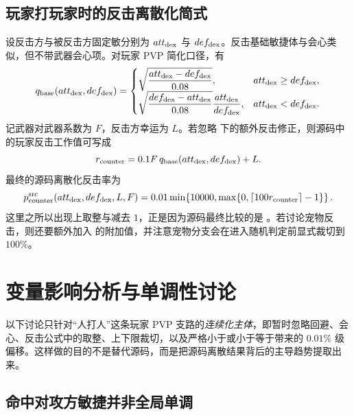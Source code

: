 \subsection{玩家打玩家时的反击离散化简式}

设反击方与被反击方固定敏分别为 $att_{\mathrm{dex}}$ 与 $def_{\mathrm{dex}}$。反击基础敏捷体与会心类似，但不带武器会心项。对玩家 PVP 简化口径，有
\begin{equation}
    q_{\mathrm{base}}(att_{\mathrm{dex}},def_{\mathrm{dex}})=
    \begin{cases}
        \sqrt{\dfrac{att_{\mathrm{dex}}-def_{\mathrm{dex}}}{0.08}}, & att_{\mathrm{dex}} \ge def_{\mathrm{dex}}, \\
        \sqrt{\dfrac{def_{\mathrm{dex}}-att_{\mathrm{dex}}}{0.08}}\dfrac{att_{\mathrm{dex}}}{def_{\mathrm{dex}}}, & att_{\mathrm{dex}} < def_{\mathrm{dex}}.
    \end{cases}
    \label{eq:counter-base}
\end{equation}
记武器对武器系数为 $F$，反击方幸运为 $L$。若忽略  下的额外反击修正，则源码中的玩家反击工作值可写成
\begin{equation}
    r_{\mathrm{counter}} = 0.1F\,q_{\mathrm{base}}(att_{\mathrm{dex}},def_{\mathrm{dex}})+L.
\end{equation}
最终的源码离散化反击率为
\begin{equation}
    p_{\mathrm{counter}}^{\mathrm{src}}(att_{\mathrm{dex}},def_{\mathrm{dex}},L,F)
    = 0.01\min\!\left\{10000,\max\!\left\{0,\left\lceil 100r_{\mathrm{counter}}\right\rceil-1\right\}\right\}.
    \label{eq:counter-final}
\end{equation}
这里之所以出现上取整与减去 $1$，正是因为源码最终比较的是 。若讨论宠物反击，则还要额外加入  的附加值，并注意宠物分支会在进入随机判定前显式裁切到 $100\%$。

\section{变量影响分析与单调性讨论}

以下讨论只针对“人打人”这条玩家 PVP 支路的\emph{连续化主体}，即暂时忽略回避、会心、反击公式中的取整、上下限裁切，以及严格小于或小于等于带来的 $0.01\%$ 级偏移。这样做的目的不是替代源码，而是把源码离散结果背后的主导趋势提取出来。

\subsection{命中对攻方敏捷并非全局单调}

